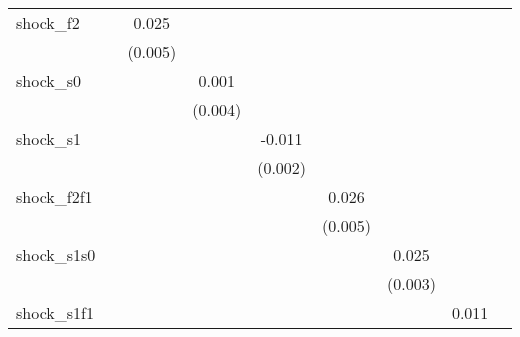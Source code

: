 {\begin{tabular}{l*{8}{c}}
\addlinespace
shock\_f2    &                     &       0.025\sym{***}&                     &                     &                     &                     &                     &                     \\
            &                     &     (0.005)         &                     &                     &                     &                     &                     &                     \\
\addlinespace
shock\_s0    &                     &                     &       0.001         &                     &                     &                     &                     &                     \\
            &                     &                     &     (0.004)         &                     &                     &                     &                     &                     \\
\addlinespace
shock\_s1    &                     &                     &                     &      -0.011\sym{***}&                     &                     &                     &                     \\
            &                     &                     &                     &     (0.002)         &                     &                     &                     &                     \\
\addlinespace
shock\_f2f1  &                     &                     &                     &                     &       0.026\sym{***}&                     &                     &                     \\
            &                     &                     &                     &                     &     (0.005)         &                     &                     &                     \\
\addlinespace
shock\_s1s0  &                     &                     &                     &                     &                     &       0.025\sym{***}&                     &                     \\
            &                     &                     &                     &                     &                     &     (0.003)         &                     &                     \\
\addlinespace
shock\_s1f1  &                     &                     &                     &                     &                     &                     &       0.011\sym{**} &                     \\

\end{tabular}}
